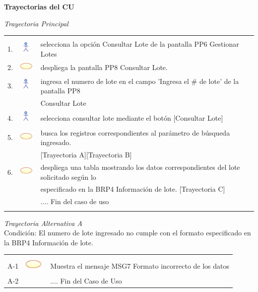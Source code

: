 \documentclass[10pt,spanish]{article}
\providecommand{\tabularnewline}{\\}
\begin{document}
	\textbf{\large Trayectorias del CU}{\large \par}
	\textit{\large Trayectoria Principal}{\large{} }{\large \par}
	\begin{tabular}{ccl}
	 &  & \tabularnewline
	1. & \includegraphics{actor} & selecciona la opción Consultar Lote de la pantalla PP6 Gestionar Lotes\tabularnewline	
	2. & \includegraphics{sistema} & despliega la pantalla PP8 Consultar Lote.\tabularnewline			 		 	 
	3. & \includegraphics{actor} & ingresa el numero de lote en el campo 'Ingresa el \# de lote' de la pantalla PP8\tabularnewline
	& &  Consultar Lote \tabularnewline
	4. & \includegraphics{actor} & selecciona consultar lote mediante el botón [Consultar Lote]\tabularnewline 
	5. & \includegraphics{sistema} & busca los registros correspondientes al parámetro de búsqueda ingresado. \tabularnewline
	& & [Trayectoria A][Trayectoria B]\tabularnewline
	6. & \includegraphics{sistema} & despliega una tabla mostrando los datos correspondientes del lote solicitado según lo\tabularnewline
	& & especificado en la BRP4 Información de lote. [Trayectoria C]\tabularnewline
	 &  & .... Fin del caso de uso\tabularnewline \\
	\end{tabular}	
	\newpage
	\textit{Trayectoria Alternativa A}\\
	Condición: El numero de lote ingresado no cumple con el formato especificado en la BRP4 Información de lote.\\
	\begin{tabular}{ccl}
	& & \tabularnewline
	A-1 & \includegraphics{sistema} & Muestra el mensaje MSG7 Formato incorrecto de los datos\tabularnewline	
	A-2 & & .... Fin del Caso de Uso\tabularnewline
	\end{tabular}	
\end{document}
